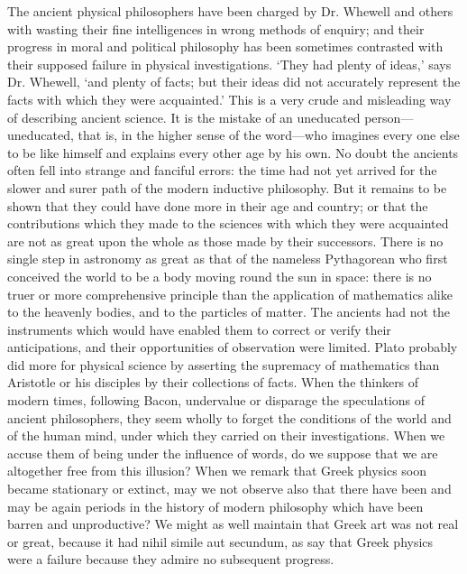 The ancient physical philosophers have been charged by Dr. Whewell and
others with wasting their fine intelligences in wrong methods of enquiry;
and their progress in moral and political philosophy has been sometimes
contrasted with their supposed failure in physical investigations. ‘They
had plenty of ideas,’ says Dr. Whewell, ‘and plenty of facts; but their
ideas did not accurately represent the facts with which they were
acquainted.’ This is a very crude and misleading way of describing ancient
science. It is the mistake of an uneducated person—uneducated, that
is, in the higher sense of the word—who imagines every one else to
be like himself and explains every other age by his own. No doubt the
ancients often fell into strange and fanciful errors: the time had not yet
arrived for the slower and surer path of the modern inductive philosophy.
But it remains to be shown that they could have done more in their age and
country; or that the contributions which they made to the sciences with
which they were acquainted are not as great upon the whole as those made
by their successors. There is no single step in astronomy as great as that
of the nameless Pythagorean who first conceived the world to be a body
moving round the sun in space: there is no truer or more comprehensive
principle than the application of mathematics alike to the heavenly
bodies, and to the particles of matter. The ancients had not the
instruments which would have enabled them to correct or verify their
anticipations, and their opportunities of observation were limited. Plato
probably did more for physical science by asserting the supremacy of
mathematics than Aristotle or his disciples by their collections of facts.
When the thinkers of modern times, following Bacon, undervalue or
disparage the speculations of ancient philosophers, they seem wholly to
forget the conditions of the world and of the human mind, under which they
carried on their investigations. When we accuse them of being under the
influence of words, do we suppose that we are altogether free from this
illusion? When we remark that Greek physics soon became stationary or
extinct, may we not observe also that there have been and may be again
periods in the history of modern philosophy which have been barren and
unproductive? We might as well maintain that Greek art was not real or
great, because it had nihil simile aut secundum, as say that Greek physics
were a failure because they admire no subsequent progress.

